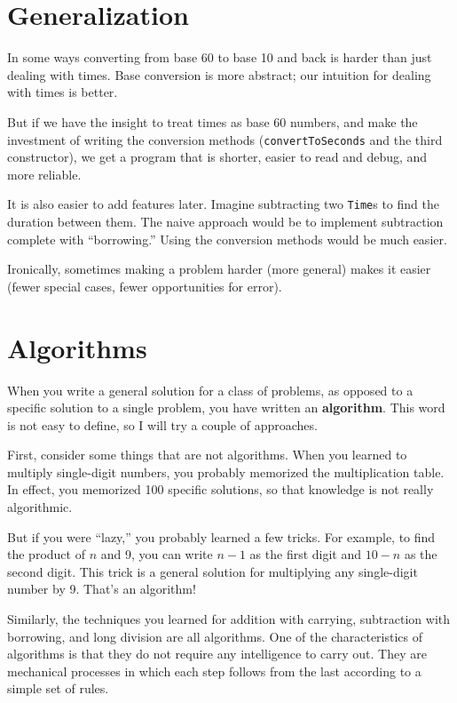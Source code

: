 \documentclass[12pt]{book}
\theoremstyle{exercise}
\begin{document}
\section{Generalization}

In some ways converting from base 60 to base 10 and back is
harder than just dealing with times.  Base conversion is more
abstract; our intuition for dealing with times is better.

But if we have the insight to treat times as base 60 numbers,
and make the investment of writing the conversion methods
({\tt convertToSeconds} and the third constructor), we get
a program that is shorter, easier to read and debug, and more
reliable.

It is also easier to add features later.  Imagine
subtracting two {\tt Time}s to find the duration between them.  The
naive approach would be to implement subtraction complete with
``borrowing.''  Using the conversion methods would be much easier.

Ironically, sometimes making a problem harder (more general)
makes it easier (fewer special cases, fewer opportunities for error).


\section{Algorithms}
\label{algorithm}

When you write a general solution for a class of problems, as
opposed to a specific solution to a single problem, you have
written an {\bf algorithm}.  This word is
not easy to define, so I will try a couple of approaches.

First, consider some things that are not algorithms.  When you learned
to multiply single-digit numbers, you probably memorized the
multiplication table.  In effect, you memorized 100 specific
solutions, so that knowledge is not really algorithmic.

But if you were ``lazy,'' you probably learned a few
tricks.  For example, to find the product of $n$ and 9, you can
write $n-1$ as the first digit and $10-n$ as the second digit.  This
trick is a general solution for multiplying any single-digit number by 9.
That's an algorithm!

Similarly, the techniques you learned for addition with carrying,
subtraction with borrowing, and long division are all algorithms.  One
of the characteristics of algorithms is that they do not require any
intelligence to carry out.  They are mechanical processes in which
each step follows from the last according to a simple set of rules.
\end{document}
